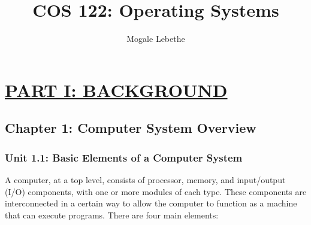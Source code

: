 \documentclass{article}
\title{COS 122: Operating Systems}
\author{Mogale Lebethe}
\begin{document}


\tableofcontents


\newpage

\section*{\underline{PART I: BACKGROUND}}
{}

\subsection*{Chapter 1: Computer System Overview}
{}

\subsubsection*{Unit 1.1: Basic Elements of a Computer System}
{}

A computer, at a top level, consists of processor, memory, and input/output (I/O) components, with
one or more modules of each type. These components are interconnected in a certain way to allow the computer
to function as a machine that can execute programs. There are four main elements:
\end{document}
